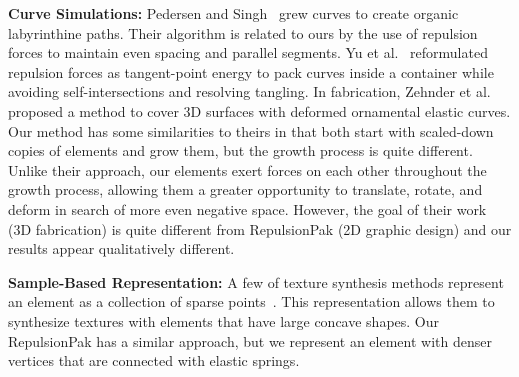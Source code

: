 \nnewtext
{
\textbf{Curve Simulations:}
Pedersen and Singh~\cite{Pedersen2006} grew curves to create organic
labyrinthine paths. Their algorithm is related to ours by the use
of repulsion forces to maintain even spacing and parallel segments.
Yu et al.~\cite{Yu2020} reformulated repulsion forces as tangent-point energy
to pack curves inside a container while avoiding self-intersections and resolving tangling.
In fabrication, Zehnder et al.~\cite{Zehnder2016} proposed a method to
cover 3D surfaces with deformed ornamental elastic curves.
Our method has some similarities to theirs in that both start with 
scaled-down copies of elements and grow them, but the growth process is quite different.  
Unlike their approach, our elements exert
forces on each other throughout the growth process, allowing them a greater
opportunity to translate, rotate, and deform in search of more even negative
space.  
However, the goal of their work (3D fabrication) is quite 
different from RepulsionPak (2D graphic design) and our results appear qualitatively
different.
}

\newtext
{
\textbf{Sample-Based Representation:}
A few of texture synthesis methods represent an element as a collection of sparse points~\cite{Ma2011, Ma2013, Hsu2020}.
This representation allows them to synthesize textures with elements
that have large concave shapes.
Our RepulsionPak has a similar approach, but we represent an element
with denser vertices that are connected with elastic springs.
}



